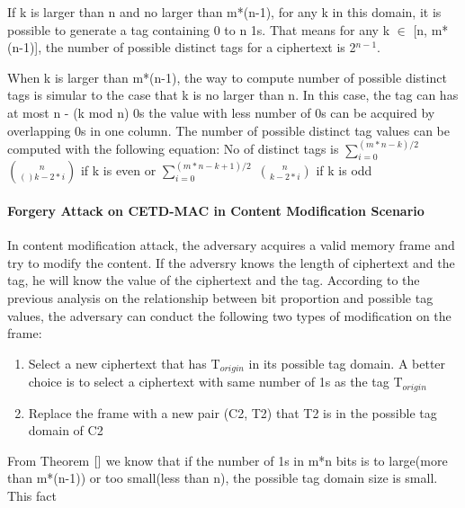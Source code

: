 \documentclass{article}
\begin{document}
If k is larger than n and no larger than m*(n-1), for any k in this domain, it is possible to generate a tag containing 0 to n 1s. That means for any k $\in$ [n, m*(n-1)], the number of possible distinct tags for a ciphertext is 2$^{n-1}$. 

When k is larger than m*(n-1), the way to compute number of possible distinct tags is simular to the case that k is no larger than n. In this case, the tag can has at most n - (k mod n) 0s the value with less number of 0s can be acquired by overlapping 0s in one column. The number of possible distinct tag values can be computed with the following equation:
No of distinct tags is $\sum_{i=0}^{(m*n-k)/2}$ $\binom{n}{()k-2*i}$ if k is even or $\sum_{i=0}^{(m*n-k+1)/2}$ $\binom{n}{k-2*i}$ if k is odd

\paragraph{Forgery Attack on CETD-MAC in Content Modification Scenario}
In content modification attack, the adversary acquires a valid memory frame and try to modify the content. If the adversry knows the length of ciphertext and the tag, he will know the value of the ciphertext and the tag. According to the previous analysis on the relationship between bit proportion and possible tag values, the adversary can conduct the following two types of modification on the frame:
\begin{enumerate}
	\item Select a new ciphertext that has T$_{origin}$ in its possible tag domain. A better choice is to select a ciphertext with same number of 1s as the tag T$_{origin}$
	\item Replace the frame with a new pair (C2, T2) that T2 is in the possible tag domain of C2
\end{enumerate}
From Theorem $\ref{}$ we know that if the number of 1s in m*n bits is to large(more than m*(n-1)) or too small(less than n), the possible tag domain size is small. This fact 

\end{document}
